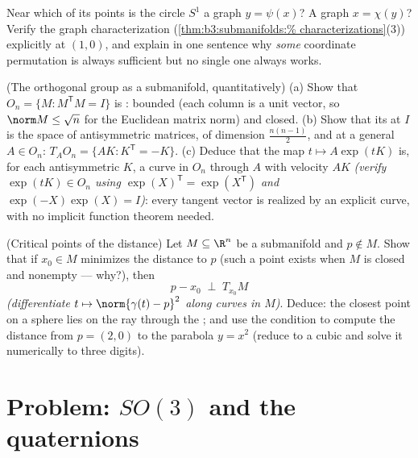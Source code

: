 \begin{exercise}[$\star\star$]\label{exo:b3:submanifolds:10}
Near which of its points is the circle $S^1$ a graph $y =
\psi(x)$? A graph $x = \chi(y)$? Verify the graph
characterization (\cref{thm:b3:submanifolds:%
characterizations}(3)) explicitly at $(1, 0)$, and explain
in one sentence why \emph{some} coordinate permutation is
always sufficient but no single one always works.
\end{exercise}

\begin{exercise}[$\star\star$]\label{exo:b3:submanifolds:11}
(The orthogonal group as a submanifold, quantitatively)
(a) Show that $O_n = \{M : M^{\mathsf T}M = I\}$ is :
bounded (each column is a unit vector, so $\norm M \leq
\sqrt n$ for the Euclidean matrix norm) and closed.
(b) Show that its  at $I$ is the space of
antisymmetric matrices, of dimension $\frac{n(n-1)}2$, and
at a general $A \in O_n$: $T_AO_n = \{AK : K^{\mathsf T} =
-K\}$.
(c) Deduce that the map $t \mapsto A\exp(tK)$ is, for each
antisymmetric $K$, a curve in $O_n$ through $A$ with
velocity $AK$ \emph{(verify $\exp(tK) \in O_n$ using
$\exp(X)^{\mathsf T} = \exp(X^{\mathsf T})$ and
$\exp(-X)\exp(X) = I$)}: every tangent vector is realized by
an explicit curve, with no implicit function theorem needed.
\end{exercise}

\begin{exercise}[$\star\star$]\label{exo:b3:submanifolds:12}
(Critical points of the distance) Let $M \subseteq \R^n$ be
a submanifold and $p \notin M$. Show that if $x_0 \in M$
minimizes the distance to $p$ (such a point exists when $M$
is closed and nonempty --- why?), then
\[
p - x_0 \;\perp\; T_{x_0}M
\]
\emph{(differentiate $t \mapsto \norm{\gamma(t) - p}^2$
along curves in $M$)}. Deduce: the closest point on a
sphere lies on the ray through the ; and use the
condition to compute the distance from $p = (2, 0)$ to the
parabola $y = x^2$ (reduce to a cubic and solve it
numerically to three digits).
\end{exercise}

\section{Problem: \texorpdfstring{$SO(3)$}{SO(3)} and the
quaternions}

